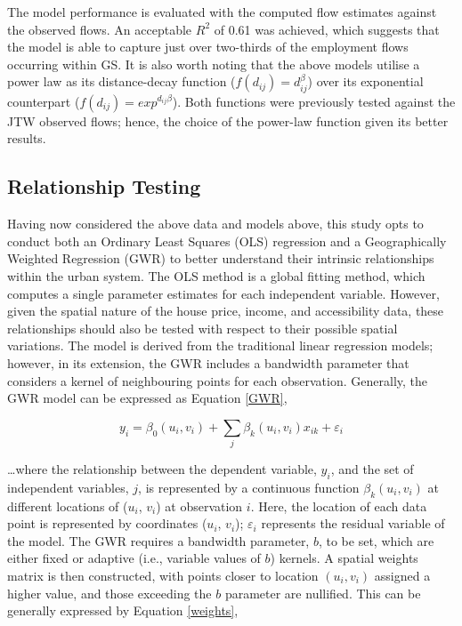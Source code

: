 The model performance is evaluated with the computed flow estimates against the observed flows. An acceptable $R^2$ of 0.61 was achieved, which suggests that the model is able to capture just over two-thirds of the employment flows occurring within GS. It is also worth noting that the above models utilise a power law as its distance-decay function ($f(d_{ij}) = d_{ij} ^{\beta}$) over its exponential counterpart ($f(d_{ij}) = exp^{d_{ij}{\beta}}$). Both functions were previously tested against the JTW observed flows; hence, the choice of the power-law function given its better results. \\

\subsection{Relationship Testing}

Having now considered the above data and models above, this study opts to conduct both an Ordinary Least Squares (OLS) regression and a Geographically Weighted Regression (GWR) to better understand their intrinsic relationships within the urban system. The OLS method is a global fitting method, which computes a single parameter estimates for each independent variable. However, given the spatial nature of the house price, income, and accessibility data, these relationships should also be tested with respect to their possible spatial variations. The model is derived from the traditional linear regression models; however, in its extension, the GWR includes a bandwidth parameter that considers a kernel of neighbouring points for each observation. Generally, the GWR model can be expressed as Equation \ref{GWR},

\begin{equation}
    y_{i} = \beta_{0}(u_{i},v_{i}) + \sum_{j}\beta_{k}(u_{i},v_{i})x_{ik} + \varepsilon_{i}
    \label{GWR}
\end{equation}

\ldots where the relationship between the dependent variable, $y_{i}$, and the set of independent variables, $j$, is represented by a continuous function $\beta_{k}(u_{i},v_{i})$ at different locations of ($u_{i}$, $v_{i}$) at observation $i$. Here, the location of each data point is represented by coordinates ($u_{i}$, $v_{i}$); $\varepsilon_{i}$ represents the residual variable of the model. The GWR requires a bandwidth parameter, $b$, to be set, which are either fixed or adaptive (i.e., variable values of $b$) kernels. A spatial weights matrix is then constructed, with points closer to location $(u_{i},v_{i})$ assigned a higher value, and those exceeding the $b$ parameter are nullified. This can be generally expressed by Equation \ref{weights},

